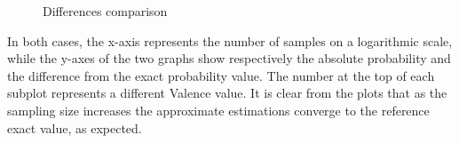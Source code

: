 \documentclass[a4paper, 12pt]{article}
\begin{document}
\begin{figure}
    \centering
    \caption{Differences comparison}
    \label{fig:differences}
\end{figure}

In both cases, the x-axis represents the number of samples on a logarithmic scale, while the y-axes of the two graphs show respectively the absolute probability and the difference from the exact probability value. The number at the top of each subplot represents a different Valence value. It is clear from the plots that as the sampling size increases the approximate estimations converge to the reference exact value, as expected.


\clearpage


\printbibliography[heading=bibintoc]
\end{document}

